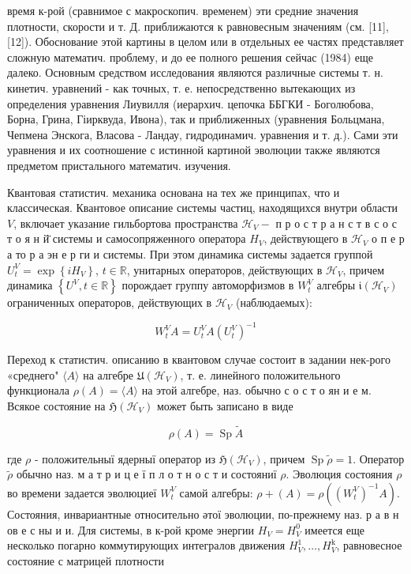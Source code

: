 \documentclass[10pt]{article}
\begin{document}
время к-рой (сравнимое с макроскопич. временем) эти средние значения плотности, скорости и т. Д. приближаются к равновесным значениям (см. [11], [12]). Обоснование этой картины в целом или в отдельных ее частях представляет сложную математич. проблему, и до ее полного решения сейчас (1984) еще далеко. Основным средством исследования являются различные системы т. н. кинетич. уравнений - как точных, т. е. непосредственно вытекающих из определения уравнения Лиувилля (иерархич. цепочка ББГКИ - Боголюбова, Борна, Грина, Гіирквуда, Ивона), так и приближенных (уравнения Больцмана, Чепмена Энскога, Власова - Ландау, гидродинамич. уравнения и т. д.). Сами эти уравнения и их соотношение с истинной картиной эволюции также являются предметом пристального математич. изучения.



Квантовая статистич. механика основана на тех же принципах, что и классическая. Квантовое описание системы частиц, находящихся внутри области $V$, включает указание гильбортова пространства $\mathscr{H}_{V}-$ п р о с т р а н с т в с о с т о я н й̈̈ системы и самосопряженного оператора $H_{V}$, действующего в $\mathscr{H}_{V}$ о п е р а то р а эн е р ги и системы. При этом динамика системы задается группой $U_{t}^{V}=\exp \left\{i H_{V}\right\}$, $t \in \mathbb{R}$, унитарных операторов, действующих в $\mathscr{H}_{V}$, причем динамика $\left\{U^{V}, t \in \mathbb{R}\right\}$ порождает группу автоморфизмов в $W_{t}^{V}$ алгебры $\mathfrak{i}\left(\mathscr{H}_{V}\right)$ ограниченных операторов, действующих в $\mathscr{H}_{V}$ (наблюдаемых):



\[

W_{t}^{V} A=U_{t}^{V} A\left(U_{t}^{V}\right)^{-1}

\]



Переход к статистич. описанию в квантовом случае состоит в задании нек-рого «среднего" $\langle A\rangle$ на алгебре $\mathfrak{U}\left(\mathscr{H}_{V}\right)$, т. е. линейного положительного функционала $\rho(A)=\langle A\rangle$ на этой алгебре, наз. обычно с о с т о ян и е м. Всякое состояние на $\mathfrak{H}\left(\mathscr{H}_{V}\right)$ может быть записано в виде



\[

\rho(A)=\operatorname{Sp} \tilde{A}

\]



где $\rho$ - положительныї ядерныї оператор из $\mathfrak{H}\left(\mathscr{H}_{V}\right)$, причем $\operatorname{Sp} \tilde{\rho}=1$. Оператор $\tilde{\rho}$ обычно наз. м а т р и ц е ї п л о т н о с т и состояниї $\rho$. Эволюция состояния $\rho$ во времени задается эволюциеї $W_{t}^{V}$ самой алгебры: $\rho+(A)=\rho\left(\left(W_{t}^{V}\right)^{-1} A\right)$. Состояния, инвариантные относительно әтої эволюции, по-прежнему наз. р а в н ов е с ны и и. Для системы, в к-рой кроме энергии $H_{V}=H_{V}^{0}$ имеется еще несколько погарно коммутирующих интегралов движения $H_{V}^{1}, \ldots, H_{V}^{\mathrm{k}}$, равновесное состояние с матрицей плотности
\end{document}

